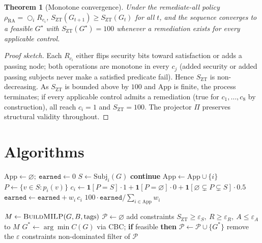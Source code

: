 \documentclass[journal]{IEEEtran}
\theoremstyle{plain}
\newtheorem{theorem}{Theorem}
\theoremstyle{definition}
\newcommand{\G}{G}
\newcommand{\Szt}{S_{\mathrm{ZT}}}
\newcommand{\App}{\mathrm{App}}
\newcommand{\Subj}{\mathrm{Subj}}
\begin{document}
\begin{theorem}[Monotone convergence]\label{thm:monotone}
Under the remediate-all policy $\rho_{\mathrm{RA}}=\bigcirc_i R_{c_i}$,
$\Szt(\G_{t+1})\ge\Szt(\G_t)$ for all $t$, and the sequence converges to a
feasible $\G^\star$ with $\Szt(\G^\star)=100$ whenever a remediation exists for
every applicable control.
\end{theorem}
\begin{proof}[Proof sketch]
Each $R_{c_i}$ either flips security bits toward satisfaction or adds a passing
node; both operations are monotone in every $c_j$ (added security or added
passing subjects never make a satisfied predicate fail). Hence $\Szt$ is
non-decreasing. As $\Szt$ is bounded above by $100$ and $\App$ is finite, the
process terminates; if every applicable control admits a remediation (true for
$c_1,\ldots,c_8$ by construction), all reach $c_i=1$ and $\Szt=100$. The
projector $\Pi$ preserves structural validity throughout.
\end{proof}

\section{Algorithms}\label{sec:algorithms}

\begin{algorithm}[t]
\caption{$\textsc{EvaluateZT}(\G)$ --- Zero-Trust satisfaction}
\label{alg:eval}
\begin{algorithmic}[1]
\State $\App\gets\varnothing;\ \texttt{earned}\gets0$
  \State $S\gets\Subj_i(\G)$
   \State \textbf{continue}  \EndIf
  \State $\App\gets\App\cup\{i\}$
  \State $P\gets\{v\in S:p_i(v)\}$
  \State $c_i\gets \mathbf{1}[P{=}S]\cdot1 + \mathbf{1}[P{=}\varnothing]\cdot0 + \mathbf{1}[\varnothing\subsetneq P\subsetneq S]\cdot0.5$
  \State $\texttt{earned}\gets\texttt{earned}+w_i\,c_i$
\EndFor
\State \Return $100\cdot\texttt{earned}/\textstyle\sum_{i\in\App}w_i$
\end{algorithmic}
\end{algorithm}

\begin{algorithm}[t]
\caption{$\textsc{ParetoSweep}(\G,B,\text{tags})$ --- exact frontier}
\label{alg:pareto}
\begin{algorithmic}[1]
\State $M\gets\textsc{BuildMILP}(\G,B,\text{tags})$ 
\State $\mathcal{P}\gets\varnothing$
  \State add constraints $\Szt\ge\varepsilon_S,\ R\ge\varepsilon_R,\ A\le\varepsilon_A$ to $M$
  \State $\G^{*}\gets\arg\min C(\G)$ via CBC; \textbf{if} feasible \textbf{then} $\mathcal{P}\gets\mathcal{P}\cup\{\G^{*}\}$
  \State remove the $\varepsilon$ constraints
\EndFor
\State \Return non-dominated filter of $\mathcal{P}$ 
\end{algorithmic}
\end{algorithm}
\end{document}

